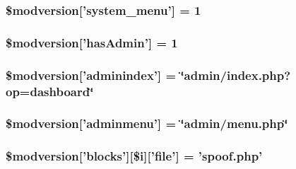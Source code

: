 \hypertarget{xoops__version_8php_af411d21e51da7d68a9c87ce5f42238c8}{
\subsubsection[{\$modversion}]{\setlength{\rightskip}{0pt plus 5cm}\$modversion\mbox{[}'system\-\_\-menu'\mbox{]} = 1}}\label{xoops__version_8php_af411d21e51da7d68a9c87ce5f42238c8}
\hypertarget{xoops__version_8php_a32e1c2084cd61fd8eed6ea4e1aa48f42}{
\subsubsection[{\$modversion}]{\setlength{\rightskip}{0pt plus 5cm}\$modversion\mbox{[}'has\-Admin'\mbox{]} = 1}}\label{xoops__version_8php_a32e1c2084cd61fd8eed6ea4e1aa48f42}
\hypertarget{xoops__version_8php_a768e74a968bcadb55351611867c017b7}{
\subsubsection[{\$modversion}]{\setlength{\rightskip}{0pt plus 5cm}\$modversion\mbox{[}'adminindex'\mbox{]} = \char`\"{}admin/index.\-php?op=dashboard\char`\"{}}}\label{xoops__version_8php_a768e74a968bcadb55351611867c017b7}
\hypertarget{xoops__version_8php_a677e42dae338738010a78548909bf2f5}{
\subsubsection[{\$modversion}]{\setlength{\rightskip}{0pt plus 5cm}\$modversion\mbox{[}'adminmenu'\mbox{]} = \char`\"{}admin/menu.\-php\char`\"{}}}\label{xoops__version_8php_a677e42dae338738010a78548909bf2f5}
\hypertarget{xoops__version_8php_af819a0cd7a3333fb95204d77af465df7}{
\subsubsection[{\$modversion}]{\setlength{\rightskip}{0pt plus 5cm}\$modversion\mbox{[}'blocks'\mbox{]}\mbox{[}\$i\mbox{]}\mbox{[}'file'\mbox{]} = 'spoof.\-php'}}\label{xoops__version_8php_af819a0cd7a3333fb95204d77af465df7}
